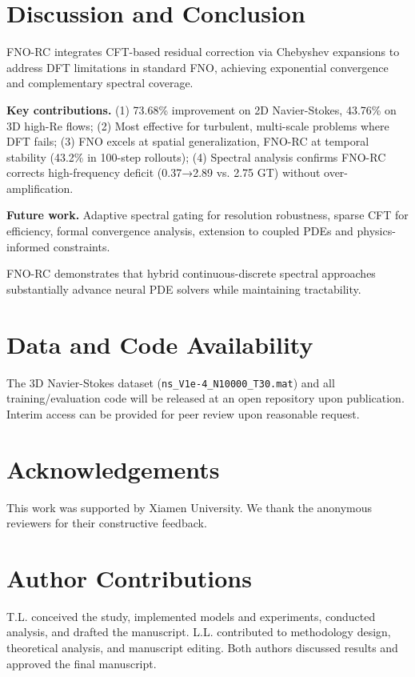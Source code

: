 \documentclass[11pt]{article}
\begin{document}
\section{Discussion and Conclusion}

FNO-RC integrates CFT-based residual correction via Chebyshev expansions to address DFT limitations in standard FNO, achieving exponential convergence and complementary spectral coverage.

\textbf{Key contributions.} (1) 73.68\% improvement on 2D Navier-Stokes, 43.76\% on 3D high-Re flows; (2) Most effective for turbulent, multi-scale problems where DFT fails; (3) FNO excels at spatial generalization, FNO-RC at temporal stability (43.2\% in 100-step rollouts); (4) Spectral analysis confirms FNO-RC corrects high-frequency deficit (0.37→2.89 vs. 2.75 GT) without over-amplification.

\textbf{Future work.} Adaptive spectral gating for resolution robustness, sparse CFT for efficiency, formal convergence analysis, extension to coupled PDEs and physics-informed constraints.

FNO-RC demonstrates that hybrid continuous-discrete spectral approaches substantially advance neural PDE solvers while maintaining tractability.

\section*{Data and Code Availability}
The 3D Navier-Stokes dataset (\texttt{ns\_V1e-4\_N10000\_T30.mat}) and all training/evaluation code will be released at an open repository upon publication. Interim access can be provided for peer review upon reasonable request.

\section*{Acknowledgements}
This work was supported by Xiamen University. We thank the anonymous reviewers for their constructive feedback.

\section*{Author Contributions}
T.L. conceived the study, implemented models and experiments, conducted analysis, and drafted the manuscript. L.L. contributed to methodology design, theoretical analysis, and manuscript editing. Both authors discussed results and approved the final manuscript.
\end{document}
